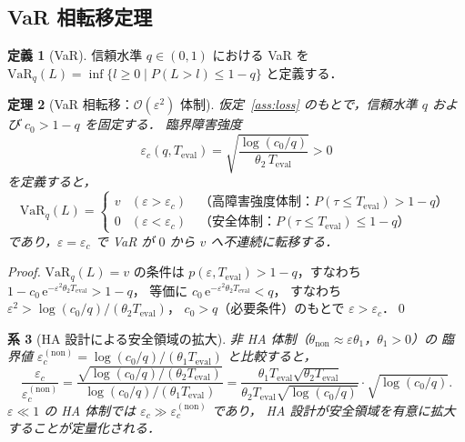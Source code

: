 \documentclass[12pt,a4paper]{article}
\theoremstyle{plain}
\newtheorem{theorem}{定理}[section]
\newtheorem{corollary}[theorem]{系}
\theoremstyle{definition}
\newtheorem{definition}[theorem]{定義}
\theoremstyle{remark}
\newcommand{\calO}{\mathcal{O}}        %
\newcommand{\eps}{\varepsilon}         %
\newcommand{\e}{\mathrm{e}}            %
\newcommand{\VaR}{\mathrm{VaR}}
\begin{document}
\subsection{VaR 相転移定理}

\begin{definition}[VaR]\label{def:VaR}
  信頼水準 $q\in(0,1)$ における VaR を
  $\VaR_q(L) = \inf\{l\ge 0 \mid P(L>l)\le 1-q\}$ と定義する．
\end{definition}

\begin{theorem}[VaR 相転移：$\calO(\eps^2)$ 体制]\label{thm:VaR}
  仮定~\ref{ass:loss} のもとで，信頼水準 $q$ および $c_0 > 1-q$ を固定する．
  臨界障害強度
  \begin{equation}\label{eq:eps_c}
    \eps_c(q,T_{\mathrm{eval}})
    = \sqrt{\frac{\log(c_0/q)}{\theta_2\,T_{\mathrm{eval}}}}
    > 0
  \end{equation}
  を定義すると，
  \begin{equation}\label{eq:VaR_phase}
    \VaR_q(L)
    = \begin{cases}
        v & (\eps > \eps_c)
            \quad\text{（高障害強度体制：$P(\tau\le T_{\mathrm{eval}})>1-q$）}\\
        0 & (\eps < \eps_c)
            \quad\text{（安全体制：$P(\tau\le T_{\mathrm{eval}})\le 1-q$）}
      \end{cases}
  \end{equation}
  であり，$\eps = \eps_c$ で VaR が $0$ から $v$ へ不連続に転移する．
\end{theorem}

\begin{proof}
  $\VaR_q(L)=v$ の条件は $p(\eps,T_{\mathrm{eval}})>1-q$，すなわち
  $1-c_0\,\e^{-\eps^2\theta_2 T_{\mathrm{eval}}}>1-q$，
  等価に $c_0\,\e^{-\eps^2\theta_2 T_{\mathrm{eval}}}<q$，
  すなわち $\eps^2>\log(c_0/q)/(\theta_2 T_{\mathrm{eval}})$，
  $c_0 > q$（必要条件）のもとで $\eps>\eps_c$．\qed
\end{proof}

\begin{corollary}[HA 設計による安全領域の拡大]\label{cor:VaR_HA}
  非 HA 体制（$\theta_{\mathrm{non}} \approx \eps\theta_1$，$\theta_1>0$）の
  臨界値 $\eps_c^{(\mathrm{non})} = \log(c_0/q)/(\theta_1 T_{\mathrm{eval}})$
  と比較すると，
  \[
    \frac{\eps_c}{\eps_c^{(\mathrm{non})}}
    = \frac{\sqrt{\log(c_0/q)/(\theta_2 T_{\mathrm{eval}})}}
           {\log(c_0/q)/(\theta_1 T_{\mathrm{eval}})}
    = \frac{\theta_1 T_{\mathrm{eval}}\sqrt{\theta_2 T_{\mathrm{eval}}}}
           {\theta_2 T_{\mathrm{eval}}\sqrt{\log(c_0/q)}}
    \cdot\sqrt{\log(c_0/q)}.
  \]
  $\eps\ll 1$ の HA 体制では $\eps_c \gg \eps_c^{(\mathrm{non})}$ であり，
  HA 設計が安全領域を有意に拡大することが定量化される．
\end{corollary}
\end{document}
